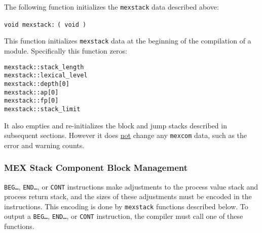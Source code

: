 \documentclass[12pt]{article}
\begin{document}
The following function initializes the {\tt mexstack} data described above:

\verb|void mexstack:|  \verb|( void )|
\begin{indpar}
This function initializes {\tt mexstack} data at the beginning
of the compilation of a module.  Specifically this function zeros:
\begin{indpar}\begin{verbatim}
mexstack::stack_length
mexstack::lexical_level
mexstack::depth[0]
mexstack::ap[0]
mexstack::fp[0]
mexstack::stack_limit
\end{verbatim}\end{indpar}

It also empties and re-initializes
the block and jump stacks described in subsequent sections.
However it does \underline{not} change any {\tt mexcom} data,
such as the error and warning counts.
\end{indpar}

\subsubsection{MEX Stack Component Block Management}
\label{MEX-STACK-COMPONENT-BLOCK-MANAGEMENT}

{\tt BEG\ldots}, {\tt END\ldots}, or {\tt CONT} instructions make
adjustments to the process value stack and process return stack,
and the sizes of these adjustments must be encoded in the instructions.
This encoding is done by {\tt mexstack} functions described below.
To output a {\tt BEG\ldots}, {\tt END\ldots}, or {\tt CONT} instruction,
the compiler must call one of these functions.
\end{document}
